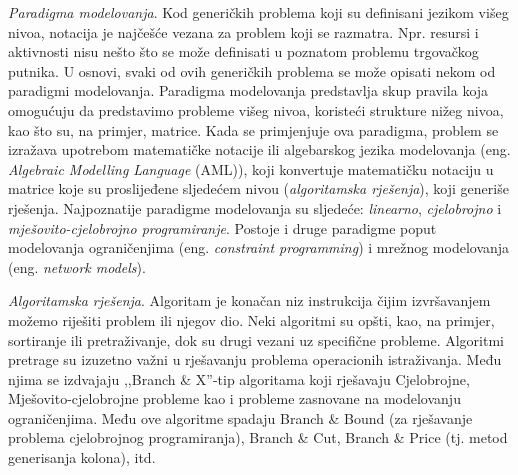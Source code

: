 \documentclass[b5paper, utf8, 11pt, colorlinks]{book}
\theoremstyle{definition}
\begin{document}
 \emph{Paradigma modelovanja}. Kod generičkih problema koji su definisani jezikom višeg nivoa, notacija je najčešće vezana za problem koji se razmatra.
 Npr. resursi i aktivnosti nisu nešto što se može definisati u poznatom problemu trgovačkog putnika. U osnovi, svaki od ovih generičkih problema se može opisati nekom od paradigmi modelovanja. Paradigma modelovanja predstavlja skup pravila koja omogućuju da predstavimo probleme višeg nivoa, koristeći strukture nižeg nivoa, kao što su, na primjer, matrice. Kada se primjenjuje ova paradigma, problem se izražava upotrebom matematičke notacije ili algebarskog jezika modelovanja (eng. \emph{Algebraic Modelling Language} (AML)), koji konvertuje matematičku notaciju u matrice koje su proslijeđene sljedećem nivou (\emph{algoritamska rješenja}), koji generiše rješenja. Najpoznatije paradigme modelovanja su sljedeće: \textit{linearno}, \textit{cjelobrojno} i \textit{mješovito-cjelobrojno programiranje}. Postoje i druge paradigme poput modelovanja ograničenjima (eng. \emph{constraint programming}) i mrežnog modelovanja (eng. \emph{network models}). 

 \emph{Algoritamska rješenja}.   Algoritam je konačan niz instrukcija čijim izvršavanjem možemo riješiti problem ili njegov dio. Neki algoritmi su opšti, kao, na primjer, sortiranje ili pretraživanje,  dok su drugi vezani uz specifične probleme. Algoritmi pretrage su izuzetno važni u rješavanju problema operacionih istraživanja. Među njima se izdvajaju ,,Branch \& X''-tip algoritama koji rješavaju Cjelobrojne, Mješovito-cjelobrojne probleme kao i probleme zasnovane na modelovanju ograničenjima. Među ove algoritme spadaju Branch \& Bound (za rješavanje problema cjelobrojnog programiranja), Branch \& Cut, Branch \& Price (tj. metod generisanja kolona), itd.
\end{document}
